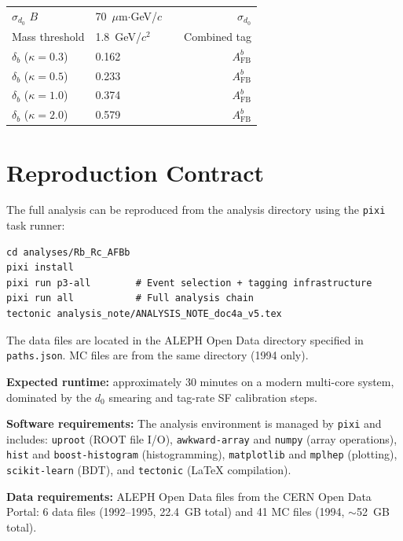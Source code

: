 \documentclass[11pt,a4paper]{article}
\begin{document}
\begin{table}[htbp]
\begin{tabular}{lllr}
$\sigma_{d_0}$ $B$ & 70~$\mu$m$\cdot$GeV/$c$ & \cite{ALEPH:Rb:precise} & $\sigma_{d_0}$ \\
Mass threshold & 1.8~GeV/$c^2$ & \cite{ALEPH:Rb:1996} & Combined tag \\
$\delta_b$ ($\kappa = 0.3$) & 0.162 & \cite{LEP:EWWG:2005} & $A_\text{FB}^b$ \\
$\delta_b$ ($\kappa = 0.5$) & 0.233 & \cite{LEP:EWWG:2005} & $A_\text{FB}^b$ \\
$\delta_b$ ($\kappa = 1.0$) & 0.374 & \cite{LEP:EWWG:2005} & $A_\text{FB}^b$ \\
$\delta_b$ ($\kappa = 2.0$) & 0.579 & \cite{LEP:EWWG:2005} & $A_\text{FB}^b$ \\
\bottomrule
\end{tabular}
\end{table}

\section{Reproduction Contract}
\label{app:reproduction}

The full analysis can be reproduced from the analysis directory
using the \texttt{pixi} task runner:

\begin{verbatim}
cd analyses/Rb_Rc_AFBb
pixi install
pixi run p3-all        # Event selection + tagging infrastructure
pixi run all           # Full analysis chain
tectonic analysis_note/ANALYSIS_NOTE_doc4a_v5.tex
\end{verbatim}

\noindent
The data files are located in the ALEPH Open Data directory
specified in \texttt{paths.json}.
MC files are from the same directory (1994 only).

\noindent
\textbf{Expected runtime:} approximately 30 minutes on a modern
multi-core system, dominated by the $d_0$ smearing and tag-rate
SF calibration steps.

\noindent
\textbf{Software requirements:} The analysis environment is
managed by \texttt{pixi} and includes: \texttt{uproot} (ROOT file
I/O), \texttt{awkward-array} and \texttt{numpy} (array operations),
\texttt{hist} and \texttt{boost-histogram} (histogramming),
\texttt{matplotlib} and \texttt{mplhep} (plotting),
\texttt{scikit-learn} (BDT), and \texttt{tectonic} (LaTeX
compilation).

\noindent
\textbf{Data requirements:} ALEPH Open Data files from the CERN
Open Data Portal: 6 data files (1992--1995, 22.4~GB total) and
41 MC files (1994, $\sim$52~GB total).
\end{document}
